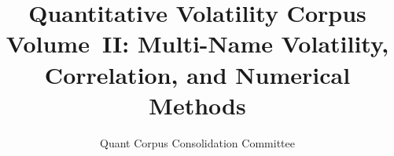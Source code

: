 \newcommand{\sB}{\sigma_B}                       %
\newcommand{\sbmean}{\bar\sigma}                 %
\newcommand{\Cega}{\mathrm{Cega}}                %
\newcommand{\VB}{\mathcal{V}_B}                  %
\newcommand{\shvega}{\mathrm{ShadowVega}}
\newcommand{\shdelta}{\mathrm{ShadowDelta}}
\newcommand{\stickyrho}{\textnormal{sticky-}\ensuremath{\rho}} %
\newcommand{\stickycvc}{\textnormal{sticky-CVC}}               %
\newcommand{\SigmaM}{\Sigma_M}                   %
\newcommand{\omM}{\omega_M}                      %
\newcommand{\symk}{\varkappa}                    %
\newcommand{\SchurC}[2]{\mathrm{Schur}_{#1}\!\left(#2\right)} %

\newcommand{\dd}{\mathrm{d}}                                  %
\newcommand{\pd}[2]{\frac{\partial #1}{\partial #2}}          %
\newcommand{\pdd}[2]{\frac{\partial^2 #1}{\partial #2^2}}     %
\newcommand{\pdc}[3]{\frac{\partial^2 #1}{\partial #2\,\partial #3}} %
\newcommand{\td}[2]{\frac{\dd #1}{\dd #2}}                    %
\newcommand{\atfixed}[2]{\left.#1\right|_{#2}}                %
\newcommand{\E}{\mathbb{E}}
\newcommand{\Var}{\operatorname{Var}}
\newcommand{\Cov}{\operatorname{Cov}}
\DeclarePairedDelimiter{\abs}{\lvert}{\rvert}
\DeclarePairedDelimiter{\norm}{\lVert}{\rVert}


\title{Quantitative Volatility Corpus\\[0.5em]\Large Volume~II: Multi-Name Volatility, Correlation, and Numerical Methods}
\author{Quant Corpus Consolidation Committee}
\date{}



\frontmatter
\maketitle
\tableofcontents

